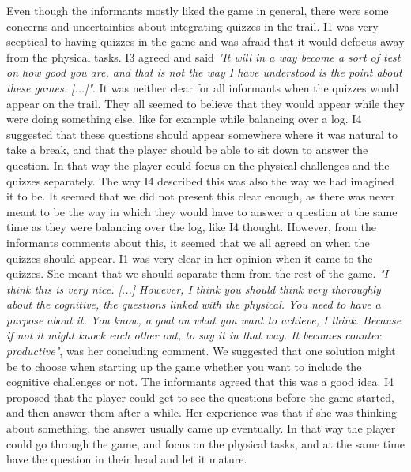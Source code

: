 Even though the informants mostly liked the game in general, there were some concerns and uncertainties about integrating quizzes in the trail. I1 was very sceptical to having quizzes in the game and was afraid that it would defocus away from the physical tasks. I3 agreed and said \emph{"It will in a way become a sort of test on how good you are, and that is not the way I have understood is the point about these games. [...]"}. It was neither clear for all informants when the quizzes would appear on the trail. They all seemed to believe that they would appear while they were doing something else, like for example while balancing over a log. I4 suggested that these questions should appear somewhere where it was natural to take a break, and that the player should be able to sit down to answer the question. In that way the player could focus on the physical challenges and the quizzes separately. The way I4 described this was also the way we had imagined it to be. It seemed that we did not present this clear enough, as there was never meant to be the way in which they would have to answer a question at the same time as they were balancing over the log, like I4 thought. However, from the informants comments about this, it seemed that we all agreed on when the quizzes should appear. I1 was very clear in her opinion when it came to the quizzes. She meant that we should separate them from the rest of the game. \emph{"I think this is very nice. [...] However, I think you should think very thoroughly about the cognitive, the questions linked with the physical. You need to have a purpose about it. You know, a goal on what you want to achieve, I think. Because if not it might knock each other out, to say it in that way. It becomes counter productive"}, was her concluding comment. We suggested that one solution might be to choose when starting up the game whether you want to include the cognitive challenges or not. The informants agreed that this was a good idea. I4 proposed that the player could get to see the questions before the game started, and then answer them after a while. Her experience was that if she was thinking about something, the answer usually came up eventually. In that way the player could go through the game, and focus on the physical tasks, and at the same time have the question in their head and let it mature. 


